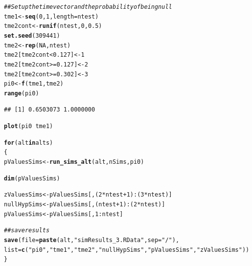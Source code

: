 \documentclass{article}\usepackage[]{graphicx}\usepackage[]{color}
\makeatletter
\newcommand{\hlnum}[1]{\textcolor[rgb]{0.686,0.059,0.569}{#1}}%
\newcommand{\hlstr}[1]{\textcolor[rgb]{0.192,0.494,0.8}{#1}}%
\newcommand{\hlcom}[1]{\textcolor[rgb]{0.678,0.584,0.686}{\textit{#1}}}%
\newcommand{\hlopt}[1]{\textcolor[rgb]{0,0,0}{#1}}%
\newcommand{\hlstd}[1]{\textcolor[rgb]{0.345,0.345,0.345}{#1}}%
\newcommand{\hlkwa}[1]{\textcolor[rgb]{0.161,0.373,0.58}{\textbf{#1}}}%
\newcommand{\hlkwb}[1]{\textcolor[rgb]{0.69,0.353,0.396}{#1}}%
\newcommand{\hlkwc}[1]{\textcolor[rgb]{0.333,0.667,0.333}{#1}}%
\newcommand{\hlkwd}[1]{\textcolor[rgb]{0.737,0.353,0.396}{\textbf{#1}}}%
\newenvironment{kframe}{%
 \def\at@end@of@kframe{}%
 \ifinner\ifhmode%
  \def\at@end@of@kframe{\end{minipage}}%
  \begin{minipage}{\columnwidth}%
 \fi\fi%
 \def\FrameCommand##1{\hskip\@totalleftmargin \hskip-\fboxsep
 \colorbox{shadecolor}{##1}\hskip-\fboxsep
     \hskip-\linewidth \hskip-\@totalleftmargin \hskip\columnwidth}%
 \MakeFramed {\advance\hsize-\width
   \@totalleftmargin\z@ \linewidth\hsize
   \@setminipage}}%
 {\par\unskip\endMakeFramed%
 \at@end@of@kframe}
\newenvironment{knitrout}{}{} %
\makeatother
\begin{document}
\begin{knitrout}
\color{fgcolor}\begin{kframe}
\begin{alltt}
\hlcom{## Set up the time vector and the probability of being null}
\hlstd{tme1} \hlkwb{<-} \hlkwd{seq}\hlstd{(}\hlnum{0}\hlstd{,}\hlnum{1}\hlstd{,}\hlkwc{length}\hlstd{=ntest)}
\hlstd{tme2cont} \hlkwb{<-} \hlkwd{runif}\hlstd{(ntest,}\hlnum{0}\hlstd{,}\hlnum{0.5}\hlstd{)}
\hlkwd{set.seed}\hlstd{(}\hlnum{309441}\hlstd{)}
\hlstd{tme2} \hlkwb{<-} \hlkwd{rep}\hlstd{(}\hlnum{NA}\hlstd{, ntest)}
\hlstd{tme2[tme2cont} \hlopt{<} \hlnum{0.127}\hlstd{]} \hlkwb{<-} \hlnum{1}
\hlstd{tme2[tme2cont} \hlopt{>=} \hlnum{0.127}\hlstd{]} \hlkwb{<-} \hlnum{2}
\hlstd{tme2[tme2cont} \hlopt{>=} \hlnum{0.302}\hlstd{]} \hlkwb{<-} \hlnum{3}
\hlstd{pi0} \hlkwb{<-} \hlkwd{f}\hlstd{(tme1, tme2)}
\hlkwd{range}\hlstd{(pi0)}
\end{alltt}
\begin{verbatim}
## [1] 0.6503073 1.0000000
\end{verbatim}
\begin{alltt}
\hlkwd{plot}\hlstd{(pi0} \hlopt{~} \hlstd{tme1)}

\hlkwa{for}\hlstd{(alt} \hlkwa{in} \hlstd{alts)}
\hlstd{\{}
  \hlstd{pValuesSims} \hlkwb{<-} \hlkwd{run_sims_alt}\hlstd{(alt, nSims, pi0)}

  \hlkwd{dim}\hlstd{(pValuesSims)}

  \hlstd{zValuesSims} \hlkwb{<-} \hlstd{pValuesSims[,(}\hlnum{2}\hlopt{*}\hlstd{ntest}\hlopt{+}\hlnum{1}\hlstd{)}\hlopt{:}\hlstd{(}\hlnum{3}\hlopt{*}\hlstd{ntest)]}
  \hlstd{nullHypSims} \hlkwb{<-} \hlstd{pValuesSims[,(ntest}\hlopt{+}\hlnum{1}\hlstd{)}\hlopt{:}\hlstd{(}\hlnum{2}\hlopt{*}\hlstd{ntest)]}
  \hlstd{pValuesSims} \hlkwb{<-} \hlstd{pValuesSims[,}\hlnum{1}\hlopt{:}\hlstd{ntest]}

  \hlcom{##save results}
  \hlkwd{save}\hlstd{(}\hlkwc{file}\hlstd{=}\hlkwd{paste}\hlstd{(alt,} \hlstr{"simResults_3.RData"}\hlstd{,}\hlkwc{sep}\hlstd{=}\hlstr{"/"}\hlstd{),}
       \hlkwc{list}\hlstd{=}\hlkwd{c}\hlstd{(}\hlstr{"pi0"}\hlstd{,} \hlstr{"tme1"}\hlstd{,} \hlstr{"tme2"}\hlstd{,} \hlstr{"nullHypSims"}\hlstd{,}\hlstr{"pValuesSims"}\hlstd{,}\hlstr{"zValuesSims"}\hlstd{))}
\hlstd{\}}
\end{alltt}
\end{kframe}


\end{knitrout}
\end{document}
